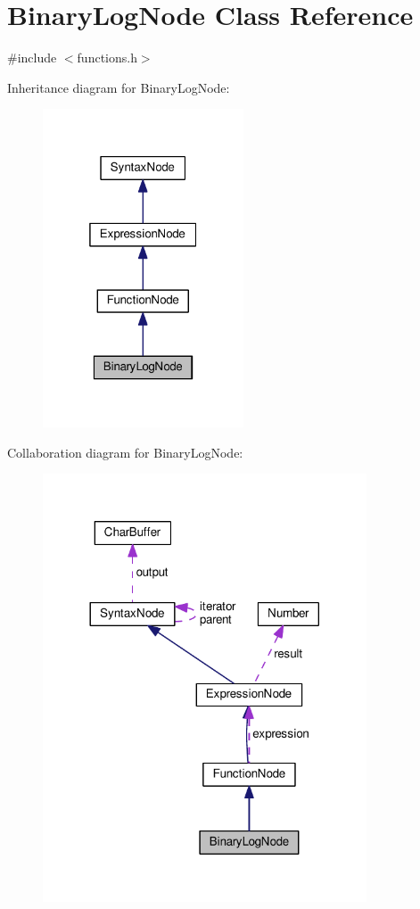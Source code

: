 \hypertarget{classBinaryLogNode}{}\section{Binary\+Log\+Node Class Reference}
\label{classBinaryLogNode}


{\ttfamily \#include $<$functions.\+h$>$}



Inheritance diagram for Binary\+Log\+Node\+:
\nopagebreak
\begin{figure}[H]
\begin{center}
\leavevmode
\includegraphics[width=169pt]{dd/de5/classBinaryLogNode__inherit__graph}
\end{center}
\end{figure}


Collaboration diagram for Binary\+Log\+Node\+:
\nopagebreak
\begin{figure}[H]
\begin{center}
\leavevmode
\includegraphics[width=272pt]{d9/dda/classBinaryLogNode__coll__graph}
\end{center}
\end{figure}

